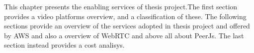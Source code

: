 
This chapter presents the enabling services of thesis project.The first section provides a video platforms overview, and a classification of these. The following sections  provide an overview of the services adopted in thesis project and offered by AWS and also a overview of WebRTC and above all about PeerJs. The last section instead provides a cost analisys.